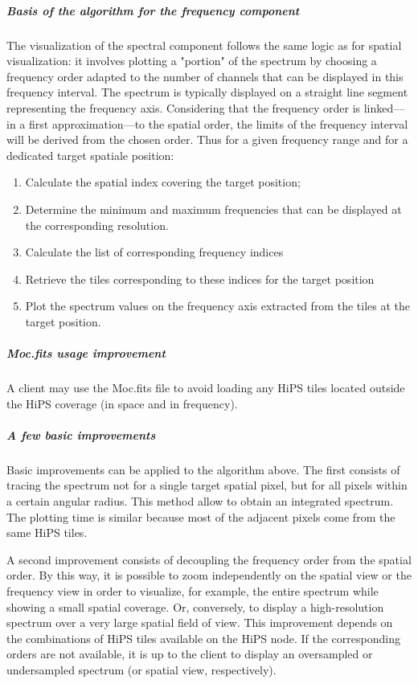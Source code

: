 \documentclass[11pt,a4paper]{ivoa}
\begin{document}
\subparagraph{Basis of the algorithm for the frequency component}

The visualization of the spectral component follows the same logic as for spatial visualization: it involves plotting a "portion" of the spectrum by choosing a frequency order adapted to the number of channels that can be displayed in this frequency interval. The spectrum is typically displayed on a straight line segment representing the frequency axis. Considering that the frequency order is linked—in a first approximation—to the spatial order, the limits of the frequency interval will be derived from the chosen order. Thus for a given frequency range and for a dedicated target spatiale position:
\begin{enumerate}
\item Calculate the spatial index covering the target position;
\item Determine the minimum and maximum frequencies that can be displayed at the corresponding resolution.
\item Calculate the list of corresponding frequency indices
\item Retrieve the tiles corresponding to these indices for the target position
\item Plot the spectrum values on the frequency axis extracted from the tiles at the target position.
\end{enumerate}

\subparagraph{Moc.fits usage improvement}

A client may use the Moc.fits file to avoid loading any HiPS tiles located outside the HiPS coverage (in space and in frequency).

\subparagraph{A few basic improvements}

Basic improvements can be applied to the algorithm above. The first consists of tracing the spectrum not for a single target spatial pixel, but for all pixels within a certain angular radius. This method allow to obtain an integrated spectrum. The plotting time is similar because most of the adjacent pixels come from the same HiPS tiles. 

A second improvement consists of decoupling the frequency order from the spatial order. By this way, it is possible to zoom independently on the spatial view or the frequency view in order to visualize, for example, the entire spectrum while showing a small spatial coverage. Or, conversely, to display a high-resolution spectrum over a very large spatial field of view. This improvement depends on the combinations of HiPS tiles available on the HiPS node. If the corresponding orders are not available, it is up to the client to display an oversampled or undersampled spectrum (or spatial view, respectively). 
\end{document}
